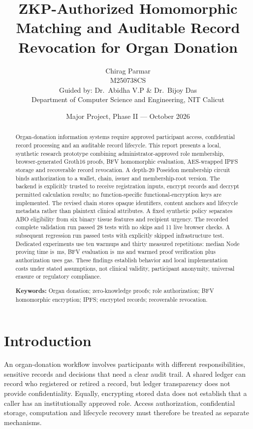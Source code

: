 \documentclass[10pt,twocolumn,a4paper]{article}
\title{\large\textbf{ZKP-Authorized Homomorphic Matching and Auditable Record Revocation for Organ Donation}}
\author{\normalsize Chirag Parmar\\
  \small M250738CS\\[2pt]
  \normalsize Guided by: Dr.~Abidha V.P \& Dr.~Bijoy Das\\
  \small Department of Computer Science and Engineering, NIT Calicut}
\date{Major Project, Phase II --- October 2026}
\begin{document}
\raggedbottom
\maketitle
\thispagestyle{empty}

\begin{abstract}
\noindent
Organ-donation information systems require approved participant access, confidential
record processing and an auditable record lifecycle. This report presents a local,
synthetic research prototype combining administrator-approved role membership,
browser-generated Groth16 proofs, BFV homomorphic evaluation, AES-wrapped IPFS
storage and recoverable record revocation. A depth-20 Poseidon membership circuit
binds authorization to a wallet, chain, issuer and membership-root version. The
backend is explicitly trusted to receive registration inputs, encrypt records and
decrypt permitted calculation results; no function-specific functional-encryption
keys are implemented. The revised chain stores opaque identifiers, content anchors
and lifecycle metadata rather than plaintext clinical attributes. A fixed synthetic
policy separates ABO eligibility from six binary tissue features and recipient
urgency. The recorded complete validation run passed 28 tests with no skips and
11 live browser checks. A subsequent regression run passed \CurrentTestsPassed{}
tests with \CurrentTestsSkipped{} explicitly skipped infrastructure test. Dedicated
experiments use ten warmups and thirty measured repetitions: median Node proving
time is \ProofMedianMs{}\,ms, BFV evaluation is \EvaluationMedianMs{}\,ms and warmed
proof verification plus authorization uses \VerificationMedianGas{} gas.
These findings establish behavior and local implementation costs under stated
assumptions, not clinical validity, participant anonymity, universal erasure or
regulatory compliance.

\smallskip\noindent
\textbf{Keywords:} Organ donation; zero-knowledge proofs; role authorization;
BFV homomorphic encryption; IPFS; encrypted records; recoverable revocation.
\end{abstract}

\section{Introduction}
\label{sec:introduction}

An organ-donation workflow involves participants with different responsibilities,
sensitive records and decisions that need a clear audit trail. A shared ledger can
record who registered or retired a record, but ledger transparency does not provide
confidentiality. Equally, encrypting stored data does not establish that a caller
has an institutionally approved role. Access authorization, confidential storage,
computation and lifecycle recovery must therefore be treated as separate mechanisms.
\end{document}
